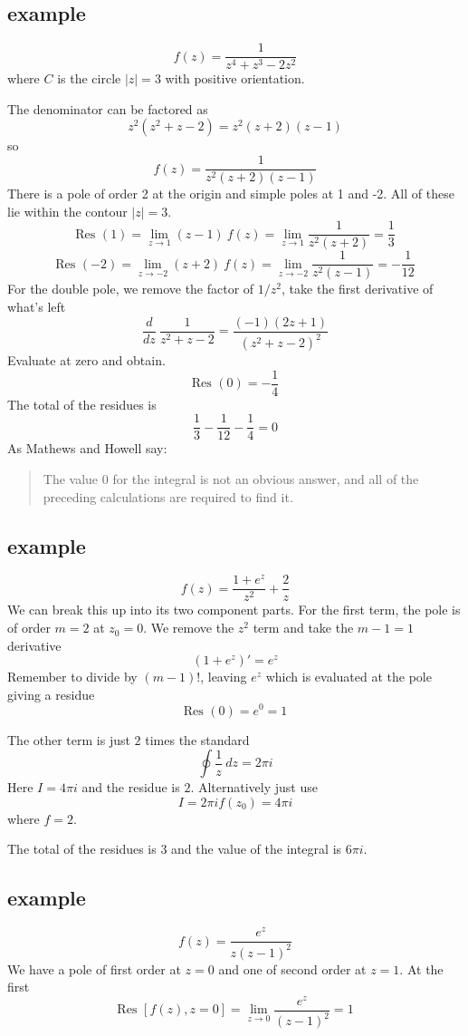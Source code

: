 \documentclass[11pt, oneside]{article}
\begin{document}
\subsection*{example}
\[ f(z) = \frac{1}{z^4 + z^3 - 2z^2} \]
where $C$ is the circle $|z| = 3$ with positive orientation.

The denominator can be factored as
\[ z^2(z^2 + z - 2) = z^2(z + 2)(z - 1) \]
so
\[ f(z) = \frac{1}{z^2(z + 2)(z - 1)} \]
There is a pole of order 2 at the origin and simple poles at 1 and -2.  All of these lie within the contour $|z| = 3$.
\[ \text{Res }(1) = \lim_{z \rightarrow 1} (z-1) \ f(z) = \lim_{z \rightarrow 1} \frac{1}{z^2 (z + 2)} = \frac{1}{3} \]
\[ \text{Res }(-2) = \lim_{z \rightarrow -2} (z+2) \ f(z) = \lim_{z \rightarrow -2} \frac{1}{z^2 (z - 1)} = -\frac{1}{12} \]
For the double pole, we remove the factor of $1/z^2$, take the first derivative of what's left
\[ \frac{d}{dz} \ \frac{1}{z^2 + z - 2} = \frac{(-1)(2z + 1)}{(z^2 + z - 2)^2} \]
Evaluate at zero and obtain.
\[ \text{Res }(0) = - \frac{1}{4} \]
The total of the residues is
\[ \frac{1}{3} -\frac{1}{12} - \frac{1}{4} = 0 \]
As Mathews and Howell say:
\begin{quote}The value 0 for the integral is not an obvious answer, and all of the preceding calculations are required to find it.\end{quote}

\subsection*{example}
\[ f(z) = \frac{1 + e^z}{z^2} + \frac{2}{z} \]
We can break this up into its two component parts.  For the first term, the pole is of order $m = 2$ at $z_0 = 0$.  We remove the $z^2$ term and take the $m-1 = 1$ derivative
\[ (1 + e^z)' = e^z \]
Remember to divide by $(m-1)!$, leaving $e^z$ which is evaluated at the pole giving a residue
\[ \text{Res }(0) = e^0 = 1 \]

The other term is just $2$ times the standard
\[ \oint \frac{1}{z} \ dz = 2 \pi i \]
Here $I = 4 \pi i$ and the residue is $2$.  Alternatively just use
\[ I = 2 \pi i f(z_0) = 4 \pi i \]
where $f = 2$.

The total of the residues is $3$ and the value of the integral is $6 \pi i$.



\subsection*{example}
\[ f(z) = \frac{e^z}{z(z-1)^2} \]
We have a pole of first order at $z=0$ and one of second order at $z=1$.  At the first
\[ \text{Res } [f(z),z=0] = \lim_{z \rightarrow 0} \frac{e^z}{(z-1)^2} = 1 \]
\end{document}
